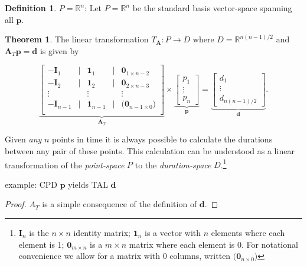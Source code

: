 \documentclass[12pt,oneside,a4paper]{article} %
\theoremstyle{definition}
\newtheorem{definition}{Definition}[section]
\newtheorem{theorem}{Theorem}[section]
\newcommand\vt[1]{\textcolor{rd}{#1}}
\begin{document}
\begin{appendices}
\begin{definition}{$P=\mathbb{R}^n$:}
Let $P=\mathbb{R}^n$ be the standard basis vector-space spanning all
$\textbf{p}$.
\end{definition}

\begin{theorem}
The linear transformation $T_\textbf{A}: P\rightarrow D$ where $D = \mathbb{R}^{n(n-1)/2}$ and $\textbf{A}_T \textbf{p} = \textbf{d}$ is given by

$$
\underbrace{\left[\begin{matrix}
-\textbf{I}_1 & \Big| & \textbf{1}_1 & \Big| & \textbf{0}_{1 \times n-2} \\
-\textbf{I}_2 & \Big| & \textbf{1}_2 & \Big| & \textbf{0}_{2 \times n-3} \\
\vdots & & \vdots & & \vdots \\
-\textbf{I}_{n-1} & \Big| & \textbf{1}_{n-1} & \Big| & \Big(\textbf{0}_{n-1 \times 0}\Big) \\
\end{matrix}\right]}_{\textbf{A}_T}
\times
\underbrace{\left[\begin{matrix}
p_1 \\ \vdots \\ p_n
\end{matrix}\right]}_{\textbf{p}}
=
\underbrace{\left[\begin{matrix}
d_1 \\ \vdots \\ d_{n(n-1)/2}
\end{matrix}\right]}_{\textbf{d}}.
$$

Given \textit{any} $n$ points in time it is always possible to calculate the
durations between any pair of these points. This calculation can be understood
as a linear transformation of the \textit{point-space} $P$ to the
\textit{duration-space} $D$.\footnote{ $\textbf{I}_n$ is the $n \times n$
identity matrix; $\textbf{1}_n$ is a vector with $n$ elements where each element is 1; $\textbf{0}_{m \times n}$ is a $m \times n$ matrix where each element is 0. For notational convenience we allow for a matrix with 0 columns, written $\Big(\textbf{0}_{n \times 0}\Big)$}
\end{theorem}

\vt{example: CPD $\textbf{p}$ yields TAL $\textbf{d}$}

\begin{proof} $A_T$ is a simple consequence of the definition of
$\textbf{d}$.
\end{proof}


\end{appendices}
\end{document}
